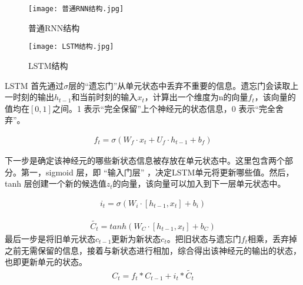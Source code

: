 \begin{figure}
    \centering
    \texttt{[image: 普通RNN结构.jpg]}
    \caption{普通RNN结构}
    \label{fig:普通RNN结构}
  \end{figure}

\begin{figure}
    \centering
    \texttt{[image: LSTM结构.jpg]}
    \caption{LSTM结构}
    \label{fig:LSTM结构}
  \end{figure}
  LSTM 首先通过$\sigma$层的“遗忘门”从单元状态中丢弃不重要的信息。遗忘门会读取上一时刻的输出$h_{t-1}$和当前时刻的输入$x_t$，计算出一个维度为n的向量$f_t$，该向量的值均在$[0, 1]$之间。1 表示“完全保留”上个神经元的状态信息，0 表示“完全舍弃”。

\begin{equation}
    \begin{aligned}
        f_t = \sigma(W_f\cdot x_t + U_f\cdot h_{t-1} + b_f)
    \end{aligned}
\end{equation}

下一步是确定该神经元的哪些新状态信息被存放在单元状态中。这里包含两个部分。第一，sigmoid 层，即 “输入门层” ，决定LSTM单元将更新哪些值。然后， tanh 层创建一个新的候选值$z_t$的向量，该向量可以加入到下一层单元状态中。

\begin{equation}
    \begin{aligned}
        i_t = \sigma(W_i\cdot[h_{t-1},x_t] + b_i)
    \end{aligned}
\end{equation}

\begin{equation}
    \begin{aligned}
        \widetilde {C_t} = tanh(W_C\cdot[h_{t-1},x_t]+b_C)
    \end{aligned}
\end{equation}
最后一步是将旧单元状态$c_{t-1}$更新为新状态$c_t$。把旧状态与遗忘门$f_t$相乘，丢弃掉之前无需保留的信息，接着与新状态进行相加，综合得出该神经元的输出的状态，也即更新单元的状态。
\begin{equation}
    \begin{aligned}
        C_t = f_t * C_{t-1} + i_t * \widetilde{C_t}
    \end{aligned}
\end{equation}


